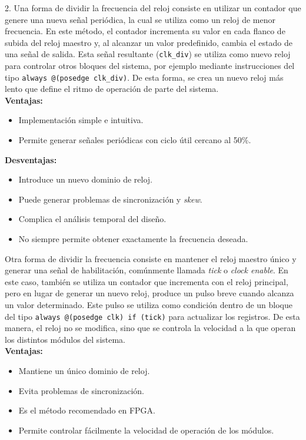 \documentclass[letterpaper, 12pt]{article}
\begin{document}
2. Una forma de dividir la frecuencia del reloj consiste en utilizar un contador que genere una nueva señal periódica, la cual se utiliza como un reloj de menor frecuencia. En este método, el contador incrementa su valor en cada flanco de subida del reloj maestro y, al alcanzar un valor predefinido, cambia el estado de una señal de salida. Esta señal resultante (\texttt{clk\_div}) se utiliza como nuevo reloj para controlar otros bloques del sistema, por ejemplo mediante instrucciones del tipo \texttt{always @(posedge clk\_div)}. De esta forma, se crea un nuevo reloj más lento que define el ritmo de operación de parte del sistema.\\

\textbf{Ventajas:}
\begin{itemize}
    \item Implementación simple e intuitiva.
    \item Permite generar señales periódicas con ciclo útil cercano al 50\%.
\end{itemize}

\textbf{Desventajas:}
\begin{itemize}
    \item Introduce un nuevo dominio de reloj.
    \item Puede generar problemas de sincronización y \textit{skew}.
    \item Complica el análisis temporal del diseño.
    \item No siempre permite obtener exactamente la frecuencia deseada.
\end{itemize}

Otra forma de dividir la frecuencia consiste en mantener el reloj maestro único y generar una señal de habilitación, comúnmente llamada \textit{tick} o \textit{clock enable}. En este caso, también se utiliza un contador que incrementa con el reloj principal, pero en lugar de generar un nuevo reloj, produce un pulso breve cuando alcanza un valor determinado. Este pulso se utiliza como condición dentro de un bloque del tipo \texttt{always @(posedge clk) if (tick)} para actualizar los registros. De esta manera, el reloj no se modifica, sino que se controla la velocidad a la que operan los distintos módulos del sistema.\\

\textbf{Ventajas:}
\begin{itemize}
    \item Mantiene un único dominio de reloj.
    \item Evita problemas de sincronización.
    \item Es el método recomendado en FPGA.
    \item Permite controlar fácilmente la velocidad de operación de los módulos.
\end{itemize}
\end{document}
